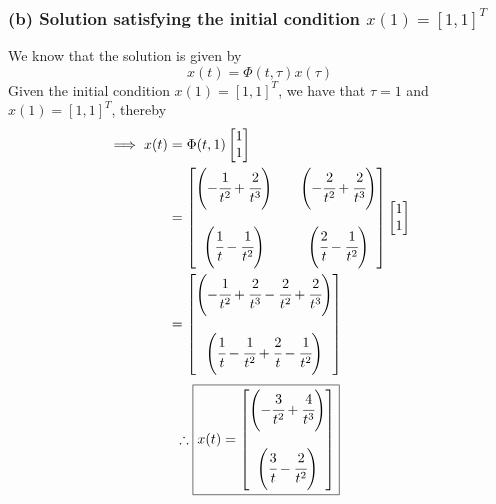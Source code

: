 \subsubsection*{(b) Solution satisfying the initial condition \( x(1) = {[1, 1]}^T \)}

We know that the solution is given by
\begin{equation*}
    x(t)
    =
    \Phi(t,\tau)x(\tau)
\end{equation*}
Given the initial condition \( x(1) = {[1, 1]}^T \), we have that \( \tau = 1 \) and \( x(1) = {[1, 1]}^T \), thereby
\begin{align*}
    \implies
    x(t)
     & =
    \Phi(t,1)
    \begin{bmatrix}
        1 \\
        1
    \end{bmatrix}
    \\ & =
    \begin{bmatrix}
        \left( -\cfrac{1}{t^2} + \cfrac{2}{t^3} \right)
         &  &
        \left( -\cfrac{2}{t^2} + \cfrac{2}{t^3} \right)
        \\ \\
        \left( \cfrac{1}{t} - \cfrac{1}{t^2} \right)
         &  &
        \left( \cfrac{2}{t} - \cfrac{1}{t^2} \right)
    \end{bmatrix}
    \begin{bmatrix}
        1 \\
        1
    \end{bmatrix}
    \\ & =
    \begin{bmatrix}
        \left( -\cfrac{1}{t^2} + \cfrac{2}{t^3} -\cfrac{2}{t^2} + \cfrac{2}{t^3} \right)
        \\ \\
        \left( \cfrac{1}{t} - \cfrac{1}{t^2} + \cfrac{2}{t} - \cfrac{1}{t^2} \right)
    \end{bmatrix}
\end{align*}
\begin{equation*}
    \therefore
    \boxed{
        x(t)
        =
        \begin{bmatrix}
            \left( -\cfrac{3}{t^2} + \cfrac{4}{t^3} \right)
            \\ \\
            \left( \cfrac{3}{t} - \cfrac{2}{t^2} \right)
        \end{bmatrix}
    }
\end{equation*}
